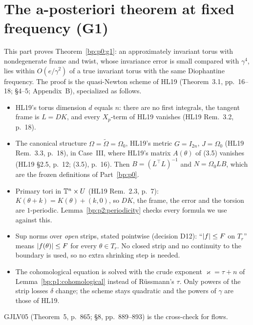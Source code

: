 \section{The a-posteriori theorem at fixed frequency (G1)}\label{bp:p2}

This part proves Theorem~\ref{bp:p0:g1}: an approximately invariant torus with nondegenerate frame and
twist, whose invariance error is small compared with $\gamma^4$, lies within $O(e/\gamma^2)$ of a true
invariant torus with the same Diophantine frequency. The proof is the quasi-Newton scheme of HL19
(Theorem~3.1, pp.~16--18; \S4--5; Appendix~B), specialized as follows.
\begin{itemize}
\item HL19's torus dimension $d$ equals $n$: there are no first integrals, the tangent frame is $L=DK$, and every $X_p$-term of HL19
  vanishes (HL19 Rem.~3.2, p.~18).
\item The canonical structure $\Omega=\tilde\Omega=\Omega_0$, HL19's metric $G=I_{2n}$, $J=\Omega_0$ (HL19
  Rem.~3.3, p.~18), in Case~III, where HL19's matrix $A(\theta)$ of (3.5) vanishes (HL19 \S2.5, p.~12;
  (3.5), p.~16). Then $B=(L^\top L)^{-1}$ and
  $N=\Omega_0LB$, which are the frozen definitions of Part~\ref{bp:p0}.
\item Primary tori in $\mathbb{T}^n\times U$ (HL19 Rem.~2.3, p.~7): $K(\theta+k)=K(\theta)+(k,0)$, so $DK$, the
  frame, the error and the torsion are $1$-periodic. Lemma~\ref{bp:p2:periodicity} checks every formula
  we use against this.
\item Sup norms over \emph{open} strips, stated pointwise (decision D12): ``$\lvert f\rvert\le F$ on $T_r$''
  means $\lvert f(\theta)\rvert\le F$ for every $\theta\in T_r$. No closed strip and no continuity to the
  boundary is used, so no extra shrinking step is needed.
\item The cohomological equation is solved with the crude exponent $\varkappa=\tau+n$ of
  Lemma~\ref{bp:p1:cohomological} instead of R\"ussmann's $\tau$. Only powers of the strip losses
  $\delta$ change; the scheme stays quadratic and the powers of $\gamma$ are those of HL19.
\end{itemize}
GJLV05 (Theorem~5, p.~865; \S8, pp.~889--893) is the cross-check for flows.

